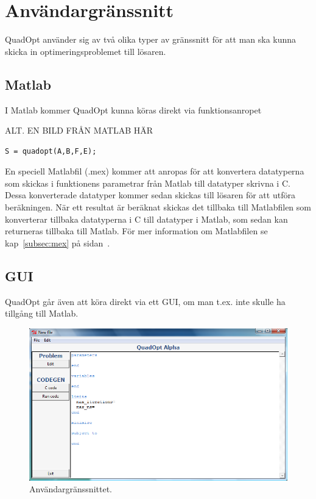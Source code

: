 \section{Användargränssnitt}
QuadOpt använder sig av två olika typer av gränssnitt för att man ska kunna skicka in optimeringsproblemet till lösaren.

\subsection{Matlab}
I Matlab kommer QuadOpt kunna köras direkt via funktionsanropet

ALT. EN BILD FRÅN MATLAB HÄR

\begin{lstlisting}
S = quadopt(A,B,F,E);
\end{lstlisting}
En speciell Matlabfil (.mex) kommer att anropas för att konvertera datatyperna som skickas i funktionens parametrar från Matlab till datatyper skrivna i C. Dessa konverterade datatyper kommer sedan skickas till lösaren för att utföra beräkningen. När ett resultat är beräknat skickas det tillbaka till Matlabfilen som konverterar tillbaka datatyperna i C till datatyper i Matlab, som sedan kan returneras tillbaka till Matlab.
För mer information om Matlabfilen se kap~\ref{subsec:mex} på sidan~\pageref{subsec:mex}.

\subsection{GUI}
QuadOpt går även att köra direkt via ett GUI, om man t.ex. inte skulle ha tillgång till Matlab.

\begin{figure}[h]
	\begin{center}
		\includegraphics[scale=0.5]{bilder/gui.png}
	\end{center}
	\caption{Användargränssnittet.}
\end{figure}

